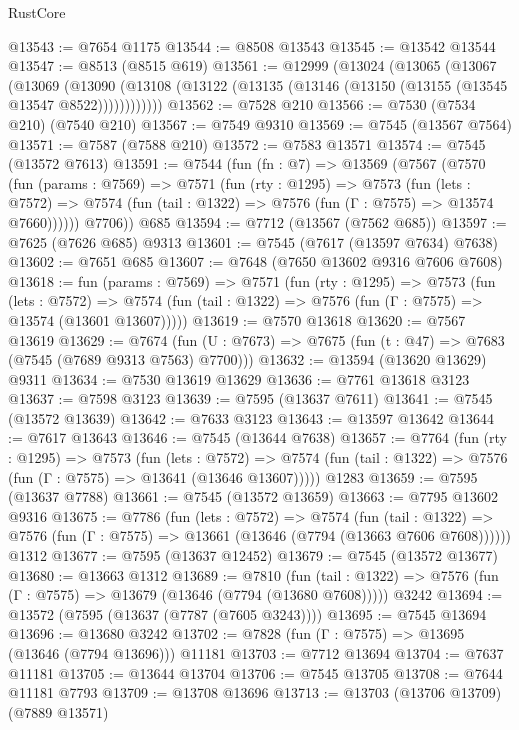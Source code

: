 \begin{lexlean}{RustCore}
\begin{coremodule}
@13543 := @7654 @1175
@13544 := @8508 @13543
@13545 := @13542 @13544
@13547 := @8513 (@8515 @619)
@13561 := @12999
    (@13024
      (@13065
        (@13067
          (@13069
            (@13090 (@13108 (@13122 (@13135 (@13146 (@13150 (@13155 (@13545 @13547 @8522))))))))))))
@13562 := @7528 @210
@13566 := @7530 (@7534 @210) (@7540 @210)
@13567 := @7549 @9310
@13569 := @7545 (@13567 @7564)
@13571 := @7587 (@7588 @210)
@13572 := @7583 @13571
@13574 := @7545 (@13572 @7613)
@13591 := @7544
    (fun (fn : @7) =>
    @13569
      (@7567
        (@7570
          (fun (params : @7569) =>
          @7571
            (fun (rty : @1295) =>
            @7573
              (fun (lets : @7572) =>
              @7574 (fun (tail : @1322) => @7576 (fun (Γ : @7575) => @13574 @7660))))))
        @7706))
    @685
@13594 := @7712 (@13567 (@7562 @685))
@13597 := @7625 (@7626 @685) @9313
@13601 := @7545 (@7617 (@13597 @7634) @7638)
@13602 := @7651 @685
@13607 := @7648 (@7650 @13602 @9316 @7606 @7608)
@13618 := fun (params : @7569) =>
  @7571
    (fun (rty : @1295) =>
    @7573
      (fun (lets : @7572) =>
      @7574 (fun (tail : @1322) => @7576 (fun (Γ : @7575) => @13574 (@13601 @13607)))))
@13619 := @7570 @13618
@13620 := @7567 @13619
@13629 := @7674
    (fun (U : @7673) => @7675 (fun (t : @47) => @7683 (@7545 (@7689 @9313 @7563) @7700)))
@13632 := @13594 (@13620 @13629) @9311
@13634 := @7530 @13619 @13629
@13636 := @7761 @13618 @3123
@13637 := @7598 @3123
@13639 := @7595 (@13637 @7611)
@13641 := @7545 (@13572 @13639)
@13642 := @7633 @3123
@13643 := @13597 @13642
@13644 := @7617 @13643
@13646 := @7545 (@13644 @7638)
@13657 := @7764
    (fun (rty : @1295) =>
    @7573
      (fun (lets : @7572) =>
      @7574 (fun (tail : @1322) => @7576 (fun (Γ : @7575) => @13641 (@13646 @13607)))))
    @1283
@13659 := @7595 (@13637 @7788)
@13661 := @7545 (@13572 @13659)
@13663 := @7795 @13602 @9316
@13675 := @7786
    (fun (lets : @7572) =>
    @7574
      (fun (tail : @1322) =>
      @7576 (fun (Γ : @7575) => @13661 (@13646 (@7794 (@13663 @7606 @7608))))))
    @1312
@13677 := @7595 (@13637 @12452)
@13679 := @7545 (@13572 @13677)
@13680 := @13663 @1312
@13689 := @7810
    (fun (tail : @1322) => @7576 (fun (Γ : @7575) => @13679 (@13646 (@7794 (@13680 @7608)))))
    @3242
@13694 := @13572 (@7595 (@13637 (@7787 (@7605 @3243))))
@13695 := @7545 @13694
@13696 := @13680 @3242
@13702 := @7828 (fun (Γ : @7575) => @13695 (@13646 (@7794 @13696))) @11181
@13703 := @7712 @13694
@13704 := @7637 @11181
@13705 := @13644 @13704
@13706 := @7545 @13705
@13708 := @7644 @11181 @7793
@13709 := @13708 @13696
@13713 := @13703 (@13706 @13709) (@7889 @13571)

\end{coremodule}
\end{lexlean}
